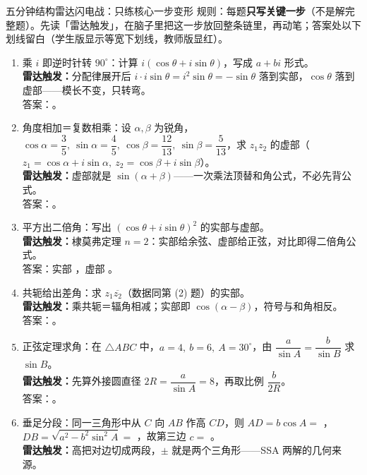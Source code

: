 \begin{warmupbox}{五分钟结构雷达闪电战：只练核心一步变形}
规则：每题\textbf{只写关键一步}（不是解完整题）。先读「雷达触发」，在脑子里把这一步放回整条链里，再动笔；答案处以下划线留白（学生版显示等宽下划线，教师版显红）。

\begin{enumerate}[label=(\arabic*), itemsep=5pt]
\item 乘 $i$ 即逆时针转 $90^\circ$：计算 $i(\cos\theta+i\sin\theta)$，写成 $a+b i$ 形式。\\
{\small\bfseries\textcolor{third}{雷达触发：}}分配律展开后 $i\cdot i\sin\theta=i^2\sin\theta=-\sin\theta$ 落到实部，$\cos\theta$ 落到虚部——模长不变，只转弯。\\
答案：。

\item 角度相加＝复数相乘：设 $\alpha,\beta$ 为锐角，$\cos\alpha=\dfrac35,\ \sin\alpha=\dfrac45,\ \cos\beta=\dfrac{12}{13},\ \sin\beta=\dfrac5{13}$，求 $z_1z_2$ 的虚部（$z_1=\cos\alpha+i\sin\alpha,\ z_2=\cos\beta+i\sin\beta$）。\\
{\small\bfseries\textcolor{third}{雷达触发：}}虚部就是 $\sin(\alpha+\beta)$——一次乘法顶替和角公式，不必先背公式。\\
答案：。

\item 平方出二倍角：写出 $(\cos\theta+i\sin\theta)^2$ 的实部与虚部。\\
{\small\bfseries\textcolor{third}{雷达触发：}}棣莫弗定理 $n=2$：实部给余弦、虚部给正弦，对比即得二倍角公式。\\
答案：实部 \tk{\cos^2\theta-\sin^2\theta}，虚部 \tk{2\sin\theta\cos\theta}。

\item 共轭给出差角：求 $z_1\overline{z_2}$（数据同第 (2) 题）的实部。\\
{\small\bfseries\textcolor{third}{雷达触发：}}乘共轭＝辐角相减；实部即 $\cos(\alpha-\beta)$，符号与和角相反。\\
答案：。

\item 正弦定理求角：在 $\triangle ABC$ 中，$a=4,\ b=6,\ A=30^\circ$，由 $\dfrac{a}{\sin A}=\dfrac{b}{\sin B}$ 求 $\sin B$。\\
{\small\bfseries\textcolor{third}{雷达触发：}}先算外接圆直径 $2R=\dfrac{a}{\sin A}=8$，再取比例 $\dfrac{b}{2R}$。\\
答案：。

\item 垂足分段：同一三角形中从 $C$ 向 $AB$ 作高 $CD$，则 $AD=b\cos A=$ ，$DB=\sqrt{a^2-b^2\sin^2A}=$ ，故第三边 $c=$ 。\\
{\small\bfseries\textcolor{third}{雷达触发：}}高把对边切成两段，$\pm$ 就是两个三角形——SSA 两解的几何来源。
\end{enumerate}
\end{warmupbox}

